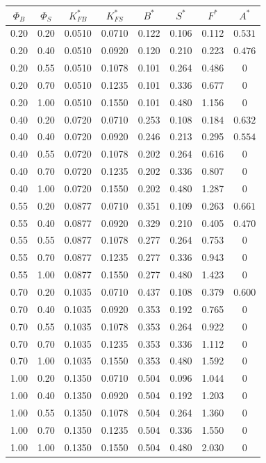 \begin{tabular}{cc|cccccc}
\toprule
$\Phi_B$ & $\Phi_S$ & $K_{FB}^*$ & $K_{FS}^*$ & $B^*$ & $S^*$ & $F^*$ & $A^*$ \\
\midrule
0.20 & 0.20 & 0.0510 & 0.0710 & 0.122 & 0.106 & 0.112 & $0.531$ \\
0.20 & 0.40 & 0.0510 & 0.0920 & 0.120 & 0.210 & 0.223 & $0.476$ \\
0.20 & 0.55 & 0.0510 & 0.1078 & 0.101 & 0.264 & 0.486 & $0$ \\
0.20 & 0.70 & 0.0510 & 0.1235 & 0.101 & 0.336 & 0.677 & $0$ \\
0.20 & 1.00 & 0.0510 & 0.1550 & 0.101 & 0.480 & 1.156 & $0$ \\
0.40 & 0.20 & 0.0720 & 0.0710 & 0.253 & 0.108 & 0.184 & $0.632$ \\
0.40 & 0.40 & 0.0720 & 0.0920 & 0.246 & 0.213 & 0.295 & $0.554$ \\
0.40 & 0.55 & 0.0720 & 0.1078 & 0.202 & 0.264 & 0.616 & $0$ \\
0.40 & 0.70 & 0.0720 & 0.1235 & 0.202 & 0.336 & 0.807 & $0$ \\
0.40 & 1.00 & 0.0720 & 0.1550 & 0.202 & 0.480 & 1.287 & $0$ \\
0.55 & 0.20 & 0.0877 & 0.0710 & 0.351 & 0.109 & 0.263 & $0.661$ \\
0.55 & 0.40 & 0.0877 & 0.0920 & 0.329 & 0.210 & 0.405 & $0.470$ \\
0.55 & 0.55 & 0.0877 & 0.1078 & 0.277 & 0.264 & 0.753 & $0$ \\
0.55 & 0.70 & 0.0877 & 0.1235 & 0.277 & 0.336 & 0.943 & $0$ \\
0.55 & 1.00 & 0.0877 & 0.1550 & 0.277 & 0.480 & 1.423 & $0$ \\
0.70 & 0.20 & 0.1035 & 0.0710 & 0.437 & 0.108 & 0.379 & $0.600$ \\
0.70 & 0.40 & 0.1035 & 0.0920 & 0.353 & 0.192 & 0.765 & $0$ \\
0.70 & 0.55 & 0.1035 & 0.1078 & 0.353 & 0.264 & 0.922 & $0$ \\
0.70 & 0.70 & 0.1035 & 0.1235 & 0.353 & 0.336 & 1.112 & $0$ \\
0.70 & 1.00 & 0.1035 & 0.1550 & 0.353 & 0.480 & 1.592 & $0$ \\
1.00 & 0.20 & 0.1350 & 0.0710 & 0.504 & 0.096 & 1.044 & $0$ \\
1.00 & 0.40 & 0.1350 & 0.0920 & 0.504 & 0.192 & 1.203 & $0$ \\
1.00 & 0.55 & 0.1350 & 0.1078 & 0.504 & 0.264 & 1.360 & $0$ \\
1.00 & 0.70 & 0.1350 & 0.1235 & 0.504 & 0.336 & 1.550 & $0$ \\
1.00 & 1.00 & 0.1350 & 0.1550 & 0.504 & 0.480 & 2.030 & $0$ \\
\bottomrule
\end{tabular}